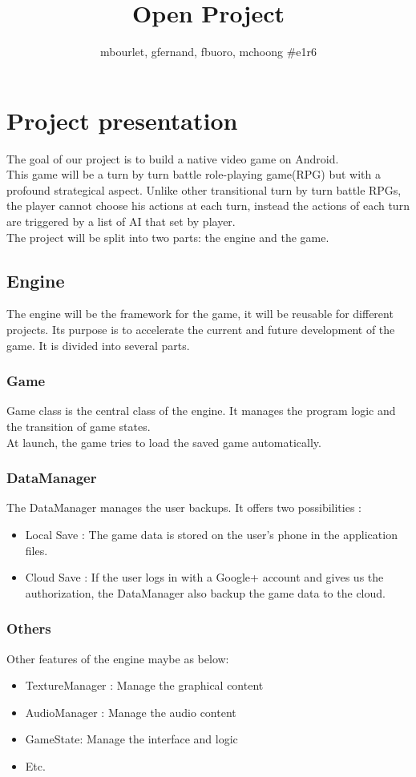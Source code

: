 \documentclass[16pt, oneside]{report}
\title{{\myfont Open Project}}
\author{mbourlet, gfernand, fbuoro, mchoong \#e1r6}
\date{}
\begin{document}
\maketitle

\chapter{Project presentation}
The goal of our project is to build a native video game on Android. \\
This game will be a turn by turn battle role-playing game(RPG) but with a profound strategical aspect. Unlike other transitional turn by turn battle RPGs, the player cannot choose his actions at each turn, instead the actions of each turn are triggered by a list of AI that set by player.\\
The project will be split into two parts: the engine and the game.

\section{Engine}
The engine will be the framework for the game, it will be reusable for different projects. Its purpose is to accelerate the current and future development of the game. It is divided into several parts.

\subsection{Game}
Game class is the central class of the engine. It manages the program logic and the transition of game states. \\
At launch, the game tries to load the saved game automatically.

\subsection{DataManager}
The DataManager manages the user backups. It offers two possibilities :
\begin {itemize}
	\item Local Save : The game data is stored on the user's phone in the application files.
	\item Cloud Save : If the user logs in with a Google+ account and gives us the authorization, the DataManager also backup the game data to the cloud. \\ 
\end {itemize}


\subsection{Others}
Other features of the engine maybe as below:\\
\begin {itemize}
	\item TextureManager : Manage the graphical content
	\item AudioManager : Manage the audio content
	\item GameState: Manage the interface and logic
	\item Etc.\\
\end {itemize}
\end{document}
